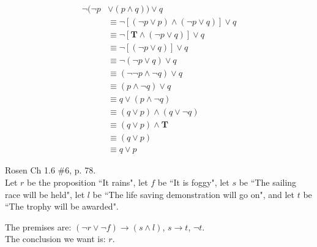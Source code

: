 \begin{questions}
\begin{solution}
\begin{parts}
    \vspace{-30pt}
    \begin{align*}
    \neg(\neg p & \vee (p \wedge q)) \vee q \\
      & \equiv \neg[ (\neg p \vee p) \wedge (\neg p \vee q) ] \vee q \tag{Distributive} \\
      & \equiv \neg[ \mathbf{T} \wedge (\neg p \vee q) ] \vee q \tag{Negation} \\
      & \equiv \neg[ (\neg p \vee q)  ] \vee q \tag{Identity} \\
      & \equiv \neg( \neg p \vee q) \vee q \tag{algebra} \\
      & \equiv (\neg \neg p \wedge \neg q) \vee q \tag{DeMorgans} \\
      & \equiv (p \wedge \neg q) \vee q \tag{Double Negation} \\
      & \equiv q \vee (p \wedge \neg q) \tag{Commutative} \\
      & \equiv (q \vee p) \wedge (q \vee \neg q) \tag{Distributive} \\
      & \equiv (q \vee p) \wedge \mathbf{T} \tag{Negation} \\
      & \equiv (q \vee p) \tag{Identity} \\
      & \equiv q \vee p \tag{algebra}
    \end{align*}
    \end{parts}
    \end{solution}



{}  Rosen Ch 1.6 \#6, p. 78.\\
Let $r$ be the proposition ``It rains", let $f$ be ``It is foggy",
    let $s$ be ``The sailing race will be held", let $l$ be ``The life
    saving demonstration will go on", and let $t$ be ``The trophy will
    be awarded".
    \ifprintanswers
        \vspace{-10pt}
    \fi
\begin{solution}
    The premises are: $(\neg r \vee \neg f) \rightarrow (s \wedge l)$, $s \rightarrow t$, $\neg t$. \\
    The conclusion we want is: $r$.


\end{solution}
\end{questions}
